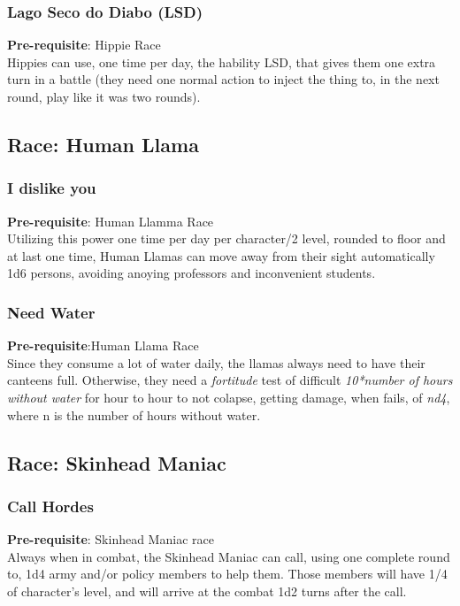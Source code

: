 \documentclass[ letterpaper,12pt]{article}
\begin{document}
\subsubsection{Lago Seco do Diabo (LSD)}
{\bf Pre-requisite}: Hippie Race\\
Hippies can use, one time per day, the hability LSD, that gives them one extra turn in a battle (they need one normal action to inject the thing to, in the next round, play like it was two rounds).

\subsection{Race: Human Llama}

\subsubsection{I dislike you}
 {\bf Pre-requisite}: Human Llamma Race\\
Utilizing this power one time per day per character/2 level, rounded to floor and at last one time, Human Llamas can move away from their sight automatically 1d6 persons, avoiding anoying professors and inconvenient students.

\subsubsection{Need Water}
{\bf Pre-requisite}:Human Llama Race\\
Since they consume a lot of water daily, the llamas always need to have their canteens full. Otherwise, they need a {\it fortitude} test of difficult {\it 10*number of hours without water} for hour to hour to not colapse, getting damage, when fails, of {\it nd4}, where n is the number of hours without water.

\subsection{Race: Skinhead Maniac}

\subsubsection{Call Hordes}
 {\bf Pre-requisite}: Skinhead Maniac race\\
 Always when in combat, the Skinhead Maniac can call, using one complete round to, 1d4 army and/or policy members to help them. Those members will have 1/4 of character's level, and will arrive at the combat 1d2 turns after the call.
\end{document}
